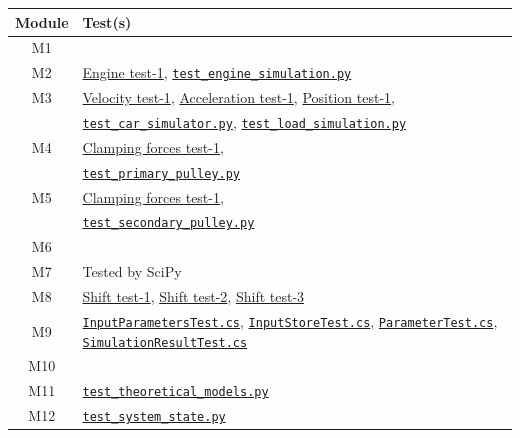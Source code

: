 \documentclass[12pt, titlepage]{article}
\begin{document}
\begin{table}[H]
  \centering
  \renewcommand{\arraystretch}{1.3} %
  \begin{tabular}{|c|p{10cm}|} %
      \hline
      \textbf{Module} & \textbf{Test(s)} \\ \hline
      M1  &  \\ \hline
      M2  & \textcolor{blue}{\hyperlink{Engine test-1}{Engine test-1}}, \hyperref[test:simulation_result]{\texttt{test\_engine\_simulation.py}} \\ \hline
      M3  & \textcolor{blue}{\hyperlink{Velocity test-1}{Velocity test-1}}, \textcolor{blue}{\hyperlink{Acceleration test-1}{Acceleration test-1}}, \textcolor{blue}{\hyperlink{Position test-1}{Position test-1}}, \\  
          & \hyperref[test:car_simulator]{\texttt{test\_car\_simulator.py}}, \hyperref[test:simulation_result]{\texttt{test\_load\_simulation.py}} \\ \hline
      M4  & \textcolor{blue}{\hyperlink{Clamping forces test-1}{Clamping forces test-1}}, \\  
          & \hyperref[test:primary_pulley]{\texttt{test\_primary\_pulley.py}} \\ \hline
      M5  & \textcolor{blue}{\hyperlink{Clamping forces test-1}{Clamping forces test-1}}, \\  
          & \hyperref[test:secondary_pulley]{\texttt{test\_secondary\_pulley.py}} \\ \hline
      M6  &  \\ \hline
      M7  & Tested by SciPy \\ \hline
      M8  & \textcolor{blue}{\hyperlink{Shift test-1}{Shift test-1}}, \textcolor{blue}{\hyperlink{Shift test-2}{Shift test-2}}, \textcolor{blue}{\hyperlink{Shift test-3}{Shift test-3}}\\ \hline
      M9  &  \hyperref[test:InputParametersTest]{\texttt{InputParametersTest.cs}}, \hyperref[test:InputStoreTest]{\texttt{InputStoreTest.cs}}, \hyperref[test:ParameterTest]{\texttt{ParameterTest.cs}}, \hyperref[test:SimulationResultTest]{\texttt{SimulationResultTest.cs}} \\ \hline
      M10 &  \\ \hline
      M11 &  \hyperref[test:theoretical_models]{\texttt{test\_theoretical\_models.py}}\\ \hline
      M12 &  \hyperref[test:system_state]{\texttt{test\_system\_state.py}}\\ \hline

\end{tabular}
\end{table}
\end{document}
